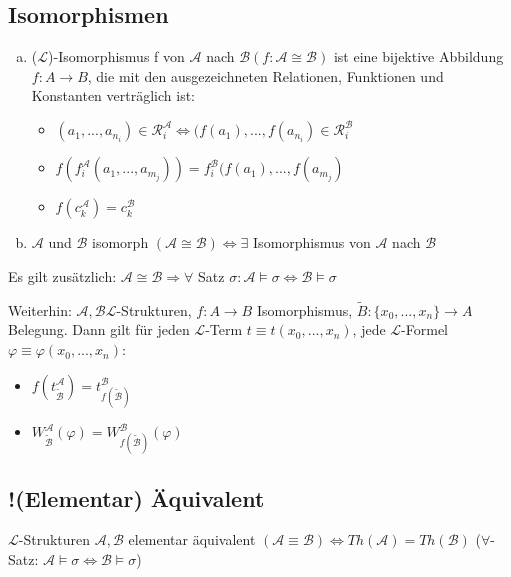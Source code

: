 \documentclass[12pt,a4paper]{article} %
\begin{document}
	\subsection{Isomorphismen}
	\begin{enumerate}[(a)]
		\item ($\mathcal{L}$)-Isomorphismus f von $\mathcal{A}$ nach $\mathcal{B} (f: \mathcal{A} \cong \mathcal{B})$ ist eine bijektive Abbildung $f: A \rightarrow B$, die mit den ausgezeichneten Relationen, Funktionen und Konstanten verträglich ist: \begin{itemize}
			\item $(a_1, ..., a_{n_i}) \in \mathcal{R}_i^{\mathcal{A}} \Leftrightarrow (f(a_1), ..., f(a_{n_i}) \in \mathcal{R}_i^{\mathcal{B}}$
			\item $f(f_i^{\mathcal{A}}(a_1, ..., a_{m_j})) = f_i^{\mathcal{B}}(f(a_1), ..., f(a_{m_j})$
			\item $f(c_k^{\mathcal{A}}) = c_k^{\mathcal{B}}$
		\end{itemize}
		\item $\mathcal{A}$ und $\mathcal{B}$ isomorph $(\mathcal{A} \cong \mathcal{B}) \Leftrightarrow \exists$ Isomorphismus von $\mathcal{A}$ nach $\mathcal{B}$
	\end{enumerate}
	
	Es gilt zusätzlich: $\mathcal{A} \cong \mathcal{B} \Rightarrow \forall$ Satz $\sigma: \mathcal{A} \vDash \sigma \Leftrightarrow \mathcal{B} \vDash \sigma$ 
	
	Weiterhin: $\mathcal{A}, \mathcal{B} \mathcal{L}$-Strukturen, $f: A \rightarrow B$ Isomorphismus, $\tilde{B}: \{x_0, ..., x_n\} \rightarrow A$ Belegung. Dann gilt für jeden $\mathcal{L}$-Term $t \equiv t(x_0, ..., x_n)$, jede $\mathcal{L}$-Formel $\varphi \equiv \varphi(x_0, ..., x_n)$: \begin{itemize}
		\item $f(t_{\tilde{\mathcal{B}}}^{\mathcal{A}}) = t_{f(\tilde{\mathcal{B}})}^{\mathcal{B}}$
		\item $W_{\tilde{\mathcal{B}}}^{\mathcal{A}}(\varphi) = W_{f(\tilde{\mathcal{B}})}^{\mathcal{B}}(\varphi)$
	\end{itemize}
	
	\subsection{!(Elementar) Äquivalent}
	$\mathcal{L}$-Strukturen $\mathcal{A}, \mathcal{B}$ elementar äquivalent $(\mathcal{A} \equiv \mathcal{B}) \Leftrightarrow Th(\mathcal{A}) = Th(\mathcal{B})$ ($\forall$-Satz: $\mathcal{A} \vDash \sigma \Leftrightarrow \mathcal{B} \vDash \sigma$)
	
\end{document}
